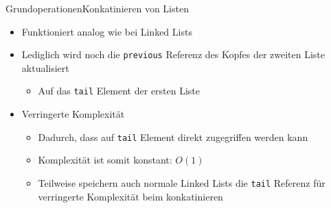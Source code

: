 \begin{frame}{Grundoperationen}{Konkatinieren von Listen}
	\begin{itemize}
		\item Funktioniert analog wie bei Linked Lists
		\item Lediglich wird noch die \texttt{previous} Referenz des Kopfes der zweiten Liste aktualisiert
		\begin{itemize}
			\item Auf das \texttt{tail} Element der ersten Liste
		\end{itemize}
		\item Verringerte Komplexität
		\begin{itemize}
			\item Dadurch, dass auf \texttt{tail} Element direkt zugegriffen werden kann
			\item Komplexität ist somit konstant: $O(1)$
			\item Teilweise speichern auch normale Linked Lists die \texttt{tail} Referenz für verringerte Komplexität beim konkatinieren
		\end{itemize}
	\end{itemize}
\end{frame}